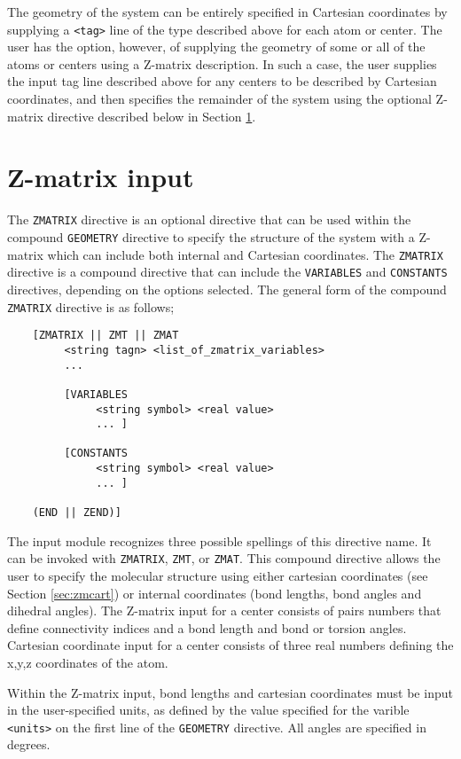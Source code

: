 The geometry of the system can be entirely specified in Cartesian coordinates
by supplying a \verb+<tag>+ line of the type described above for each atom
or center.  The user has
the option, however, of supplying the geometry of some or all of the atoms 
or centers using a Z-matrix description.  In such a case, the user supplies
the input tag line described above for any centers 
to be described by Cartesian coordinates, and then specifies the remainder
of the system using the optional
Z-matrix directive described below in Section \ref{sec:Z-matrix}.

\section{Z-matrix input}
\label{sec:Z-matrix}

The \verb+ZMATRIX+ directive is an optional directive that can be used within
the compound \verb+GEOMETRY+ directive to specify the structure of the system with a
Z-matrix which can include both internal and Cartesian coordinates. 
The \verb+ZMATRIX+ directive is a compound
directive that can include the \verb+VARIABLES+ and \verb+CONSTANTS+
directives, depending on the options selected.  The general form of the 
compound \verb+ZMATRIX+ 
directive is as follows;
\begin{verbatim}
    [ZMATRIX || ZMT || ZMAT
         <string tagn> <list_of_zmatrix_variables> 
         ... 

         [VARIABLES
              <string symbol> <real value>
              ... ]
 
         [CONSTANTS
              <string symbol> <real value>
              ... ]

    (END || ZEND)]
\end{verbatim}

The input module recognizes three possible spellings of this directive name.
It can be invoked with \verb+ZMATRIX+, \verb+ZMT+, or \verb+ZMAT+.
This compound directive allows the user to specify
the molecular structure using
either cartesian coordinates (see Section \ref{sec:zmcart}) or internal
coordinates (bond lengths, bond angles and dihedral angles).  The
Z-matrix input for a center consists of pairs numbers that define
connectivity indices and a bond length and bond or torsion angles.
Cartesian coordinate input for a center consists of three real numbers defining the
x,y,z coordinates of the atom.  

Within the Z-matrix input, bond lengths and cartesian coordinates must
be input in the user-specified units, as defined by the value specified
for the varible \verb+<units>+ on the first line of the \verb+GEOMETRY+
directive.  All angles are specified in
degrees.

